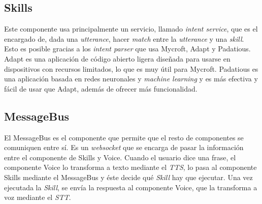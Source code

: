 \subsection{Skills}

Este componente usa principalmente un servicio, llamado \textit{intent service}, que es el encargado de, dada una \textit{utterance}, hacer \textit{match} entre la \textit{utterance} y una \textit{skill}. Esto es posible gracias a los \textit{intent parser} que usa Mycroft, Adapt y Padatious.
Adapt es una aplicación de código abierto ligera diseñada para usarse en dispositivos con recursos limitados, lo que es muy útil para Mycroft. Padatious es una aplicación basada en redes neuronales y \textit{machine learning} y es más efectiva y fácil de usar que Adapt, además de ofrecer más funcionalidad.

\subsection{MessageBus}

El MessageBus es el componente que permite que el resto de componentes se comuniquen entre sí. Es un \textit{websocket} que se encarga de pasar la información entre el componente de Skills y Voice. Cuando el usuario dice una frase, el componente Voice lo transforma a texto mediante el \textit{TTS}, lo pasa al componente Skills mediante el MessageBus y éste decide qué \textit{Skill} hay que ejecutar. Una vez ejecutada la \textit{Skill}, se envía la respuesta al componente Voice, que la transforma a voz mediante el \textit{STT}.


